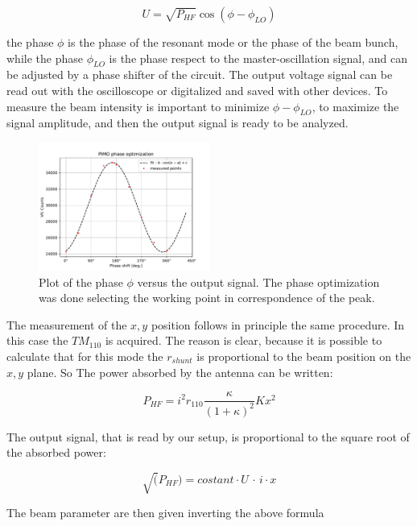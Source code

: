 \begin{equation}
U = \sqrt{P_{HF}} \cos(\phi - \phi_{LO})
\end{equation}

the phase $\phi$ is the phase of the resonant mode or the phase of the beam bunch, while the phase $\phi_{LO}$ is the phase respect to the master-oscillation signal, and can be adjusted by a phase shifter of the circuit. The output voltage signal can be read out with the oscilloscope or digitalized and saved with other devices. To measure the beam intensity is important to minimize $\phi - \phi_{LO}$, to maximize the signal amplitude, and then the output signal is ready to be analyzed.

\begin{figure}[hbtp]
\centering
\includegraphics[width = 0.5\textwidth]{ExperimentalSetup/PIMOphase.pdf}
\caption{Plot of the phase $\phi$ versus the output signal. The phase optimization was done selecting the working point in correspondence of the peak.}
\end{figure}


The measurement of the $x,y$ position follows in principle the same procedure. In this case the $TM_{110}$ is acquired. The reason is clear, because it is possible to calculate that for this mode the $r_{shunt}$ is proportional to the beam position on the $x,y$ plane. So The power absorbed by the antenna can be written:

\begin{equation}
P_{HF} = i^{2} r_{110} \frac{\kappa}{(1 + \kappa)^{2}} K x^{2}
\end{equation} 
 
The output signal, that is read by our setup, is proportional to the square root of the absorbed power:

\begin{equation}
\sqrt(P_{HF}) = costant \cdot U \, \cdot \, i   \cdot x
\end{equation} 

The beam parameter are then given inverting the above formula 

